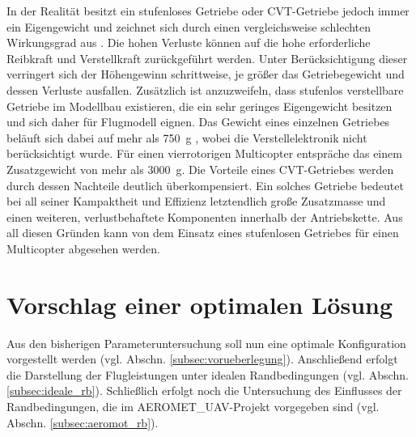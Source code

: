 In der Realität besitzt ein stufenloses Getriebe oder CVT-Getriebe jedoch immer ein Eigengewicht und zeichnet sich durch einen vergleichsweise schlechten Wirkungsgrad aus \cite[S.295-S.297]{Fischer.2016}. %
Die hohen Verluste können auf die hohe erforderliche Reibkraft und Verstellkraft zurückgeführt werden. Unter Berücksichtigung dieser verringert sich der Höhengewinn schrittweise, je größer das Getriebegewicht und dessen Verluste ausfallen. 
Zusätzlich ist anzuzweifeln, dass stufenlos verstellbare Getriebe im Modellbau existieren, die ein sehr geringes Eigengewicht besitzen und sich daher für Flugmodell eignen.
Das Gewicht eines einzelnen Getriebes beläuft sich dabei auf mehr als \SI{750}{g} \cite{cvt}, wobei die Verstellelektronik nicht berücksichtigt wurde. Für einen vierrotorigen Multicopter entspräche das einem Zusatzgewicht von mehr als \SI{3000}{g}. 
Die Vorteile eines CVT-Getriebes werden durch dessen Nachteile deutlich überkompensiert. Ein solches Getriebe bedeutet bei all seiner Kampaktheit und Effizienz letztendlich große Zusatzmasse und einen weiteren, verlustbehaftete Komponenten innerhalb der Antriebskette. Aus all diesen Gründen kann von dem Einsatz eines stufenlosen Getriebes für einen Multicopter abgesehen werden.


\section{Vorschlag einer optimalen Lösung}
\label{sec:otimale_lsg}
Aus den bisherigen Parameteruntersuchung soll nun eine optimale Konfiguration vorgestellt werden (vgl. Abschn. \ref{subsec:vorueberlegung}). Anschließend erfolgt die Darstellung der Flugleistungen unter idealen Randbedingungen (vgl. Abschn. \ref{subsec:ideale_rb}). Schließlich erfolgt noch die Untersuchung des Einflusses der Randbedingungen, die im AEROMET\_UAV-Projekt vorgegeben sind (vgl. Abschn. \ref{subsec:aeromot_rb}). 


